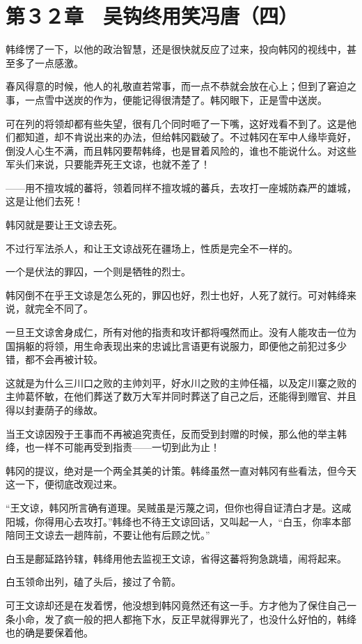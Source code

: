 \section{第３２章　吴钩终用笑冯唐（四）}

韩绛愣了一下，以他的政治智慧，还是很快就反应了过来，投向韩冈的视线中，甚至多了一点感激。

春风得意的时候，他人的礼敬直若常事，而一点不恭就会放在心上；但到了窘迫之事，一点雪中送炭的作为，便能记得很清楚了。韩冈眼下，正是雪中送炭。

可在列的将领却都有些失望，很有几个同时咂了一下嘴，这好戏看不到了。这是他们都知道，却不肯说出来的办法，但给韩冈戳破了。不过韩冈在军中人缘毕竟好，倒没人心生不满，而且韩冈要帮韩绛，也是冒着风险的，谁也不能说什么。对这些军头们来说，只要能弄死王文谅，也就不差了！

——用不擅攻城的蕃将，领着同样不擅攻城的蕃兵，去攻打一座城防森严的雄城，这是让他们去死！

韩冈就是要让王文谅去死。

不过行军法杀人，和让王文谅战死在疆场上，性质是完全不一样的。

一个是伏法的罪囚，一个则是牺牲的烈士。

韩冈倒不在乎王文谅是怎么死的，罪囚也好，烈士也好，人死了就行。可对韩绛来说，就完全不同了。

一旦王文谅舍身成仁，所有对他的指责和攻讦都将嘎然而止。没有人能攻击一位为国捐躯的将领，用生命表现出来的忠诚比言语更有说服力，即便他之前犯过多少错，都不会再被计较。

这就是为什么三川口之败的主帅刘平，好水川之败的主帅任福，以及定川寨之败的主帅葛怀敏，在他们葬送了数万大军并同时葬送了自己之后，还能得到赠官、并且得以封妻荫子的缘故。

当王文谅因殁于王事而不再被追究责任，反而受到封赠的时候，那么他的举主韩绛，也一样不可能再受到指责——一切到此为止！

韩冈的提议，绝对是一个两全其美的计策。韩绛虽然一直对韩冈有些看法，但今天这一下，便彻底改观过来。

“王文谅，韩冈所言确有道理。吴贼虽是污蔑之词，但你也得自证清白才是。这咸阳城，你得用心去攻打。”韩绛也不待王文谅回话，又叫起一人，“白玉，你率本部陪同王文谅去一趟阵前，不要让他有后顾之忧。”

白玉是鄜延路钤辖，韩绛用他去监视王文谅，省得这蕃将狗急跳墙，闹将起来。

白玉领命出列，磕了头后，接过了令箭。

可王文谅却还是在发着愣，他没想到韩冈竟然还有这一手。方才他为了保住自己一条小命，发了疯一般的把人都拖下水，反正早就得罪光了，也没什么好怕的，韩绛也的确是要保着他。

